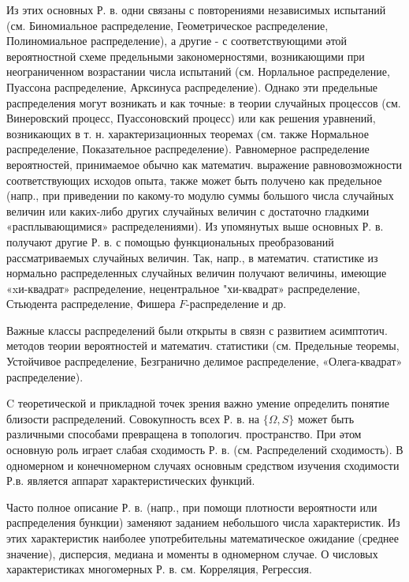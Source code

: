 \documentclass[10pt]{article}
\begin{document}
Из этих основных Р. в. одни связаны с повторениями независимых испытаний (см. Биномиальное распределение, Геометрическое распределение, Полиномиальное распределение), а другие - с соответствующими әтой вероятностной схеме предельными закономерностями, возникающими при неограниченном возрастании числа испытаний (см. Норлальное распределение, Пуассона распределение, Арксинуса распределение). Однако эти предельные распределения могут возникать и как точные: в теории случайных процессов (см. Винеровский процесс, Пуассоновский процесс) или как решения уравнений, возникающих в т. н. характеризационных теоремах (см. также Нормальное распределение, Показательное распределение). Равномерное распределение вероятностей, принимаемое обычно как математич. выражение равновозможности соответствующих исходов опыта, также может быть получено как предельное (напр., при приведении по какому-то модулю суммы большого числа случайных величин или каких-либо других случайных величин с достаточно гладкими «расплывающимися» распределениями). Из упомянутых выше основных Р. в. получают другие Р. в. с помощью функциональных преобразований рассматриваемых случайных величин. Так, напр., в математич. статистике из нормально распределенных случайных величин получают величины, имеющие «xи-квадрат» распределение, нецентральное "хи-квадрат» распределение, Стьюдента распределение, Фишера $F$-распределение и др.



Важные классы распределений были открыты в связн с развитием асимптотич. методов теории вероятностей и математич. статистики (см. Предельные теоремы, Устойчивое распределение, Безгранично делимое распределение, «Олега-квадрат» распределение).



C теоретической и прикладной точек зрения важно умение определить понятие близости распределений. Совокупность всех Р. в. на $\{\Omega, S\}$ может быть различными способами превращена в топологич. пространство. При әтом основную роль играет слабая сходимость Р. в. (см. Распределений сходимость). В одномерном и конечномерном случаях основным средством изучения сходимости Р.в. является аппарат характеристических функций.



Часто полное описание Р. в. (напр., при помощи плотности вероятности или распределения бункции) заменяют заданием небольшого числа характеристик. Из этих характеристик наиболее употребительны математическое ожидание (среднее значение), дисперсия, медиана и моменты в одномерном случае. О числовых характеристиках многомерных Р. в. см. Корреляция, Регрессия.
\end{document}
